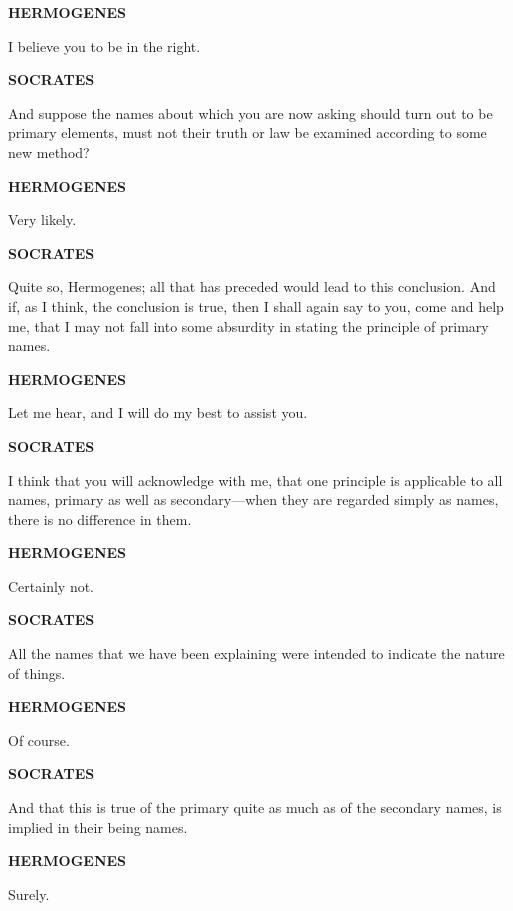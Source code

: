 \documentclass[11pt,letter]{article}
\begin{document}
\par \textbf{HERMOGENES}
\par   I believe you to be in the right.

\par \textbf{SOCRATES}
\par   And suppose the names about which you are now asking should turn out to be primary elements, must not their truth or law be examined according to some new method?

\par \textbf{HERMOGENES}
\par   Very likely.

\par \textbf{SOCRATES}
\par   Quite so, Hermogenes; all that has preceded would lead to this conclusion. And if, as I think, the conclusion is true, then I shall again say to you, come and help me, that I may not fall into some absurdity in stating the principle of primary names.

\par \textbf{HERMOGENES}
\par   Let me hear, and I will do my best to assist you.

\par \textbf{SOCRATES}
\par   I think that you will acknowledge with me, that one principle is applicable to all names, primary as well as secondary—when they are regarded simply as names, there is no difference in them.

\par \textbf{HERMOGENES}
\par   Certainly not.

\par \textbf{SOCRATES}
\par   All the names that we have been explaining were intended to indicate the nature of things.

\par \textbf{HERMOGENES}
\par   Of course.

\par \textbf{SOCRATES}
\par   And that this is true of the primary quite as much as of the secondary names, is implied in their being names.

\par \textbf{HERMOGENES}
\par   Surely.
\end{document}
